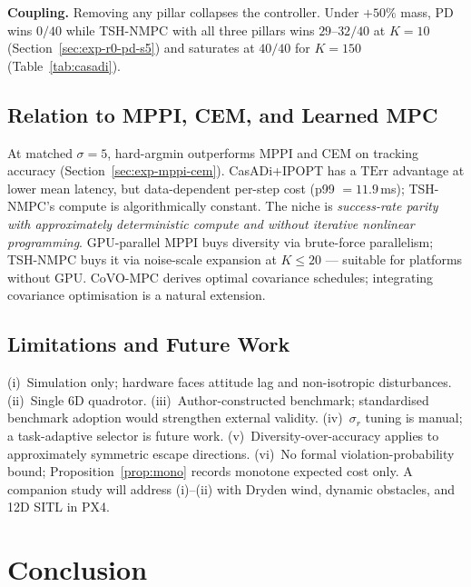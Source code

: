 \documentclass[11pt,onecolumn,a4paper]{article}
\newcommand{\TErr}{\mathrm{TErr}}
\begin{document}
\textbf{Coupling.} Removing any pillar collapses the controller.
Under $+50\%$ mass, PD wins $0/40$ while TSH-NMPC with all three
pillars wins $29$--$32/40$ at $K = 10$ (Section~\ref{sec:exp-r0-pd-s5})
and saturates at $40/40$ for $K = 150$ (Table~\ref{tab:casadi}).

\subsection{Relation to MPPI, CEM, and Learned MPC}

At matched $\sigma = 5$, hard-argmin outperforms MPPI and CEM on
tracking accuracy (Section~\ref{sec:exp-mppi-cem}). CasADi+IPOPT has a
$\TErr$ advantage at lower mean latency, but data-dependent per-step
cost (p99 $= 11.9\,$ms); TSH-NMPC's compute is algorithmically
constant. The niche is \emph{success-rate parity with approximately
deterministic compute and without iterative nonlinear programming}.
GPU-parallel MPPI \cite{WIL17} buys diversity via brute-force
parallelism; TSH-NMPC buys it via noise-scale expansion at
$K \le 20$ --- suitable for platforms without GPU. CoVO-MPC
\cite{YI24} derives optimal covariance schedules; integrating
covariance optimisation is a natural extension.

\subsection{Limitations and Future Work}\label{sec:limitations}

(i)~Simulation only; hardware faces attitude lag and non-isotropic
disturbances.
(ii)~Single 6D quadrotor.
(iii)~Author-constructed benchmark; standardised benchmark adoption
would strengthen external validity.
(iv)~$\sigma_r$ tuning is manual; a task-adaptive selector is
future work.
(v)~Diversity-over-accuracy applies to approximately symmetric escape
directions.
(vi)~No formal violation-probability bound;
Proposition~\ref{prop:mono} records monotone expected cost only.
A companion study will address (i)--(ii) with Dryden wind, dynamic
obstacles, and 12D SITL in PX4.


\section{Conclusion}\label{sec:conclusion}
\end{document}
